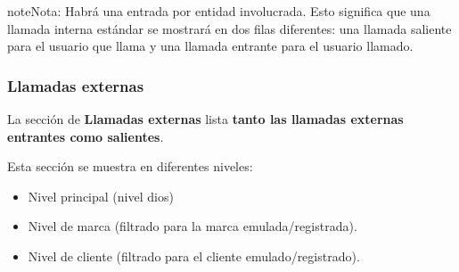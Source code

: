 \documentclass[letterpaper,10pt,spanish]{sphinxmanual}
\begin{document}
\begin{notice}{note}{Nota:}
Habrá una entrada por entidad involucrada. Esto significa que una llamada interna estándar se mostrará en dos filas diferentes: una llamada saliente para el usuario que llama y una llamada entrante para el usuario llamado.
\end{notice}


\subsubsection{Llamadas externas}
\label{administration_portal/client/retail/calls/external_calls::doc}\label{administration_portal/client/retail/calls/external_calls:external-calls}
La sección de \textbf{Llamadas externas} lista \textbf{tanto las llamadas externas entrantes como salientes}.

Esta sección se muestra en diferentes niveles:
\begin{itemize}
\item {} 
Nivel principal (nivel dios)

\item {} 
Nivel de marca (filtrado para la marca emulada/registrada).

\item {} 
Nivel de cliente (filtrado para el cliente emulado/registrado).

\end{itemize}
\end{document}
